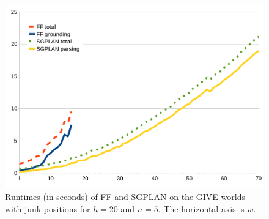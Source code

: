 \begin{figure}
  \centering
  \includegraphics[width=1\columnwidth]{graph-exp3}
  \caption{Runtimes (in seconds) of FF and SGPLAN on the GIVE worlds with junk
    positions for $h=20$ and $n=5$. The horizontal axis is $w$.}
  \label{fig:give-runtime-junk}
\end{figure}


